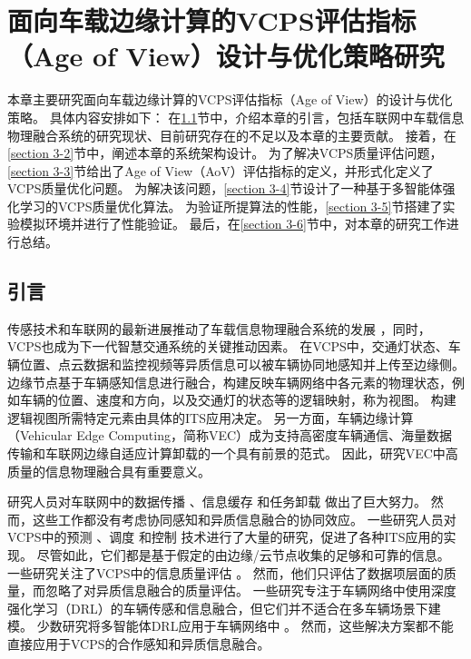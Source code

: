 \chapter{面向车载边缘计算的VCPS评估指标（Age of View）设计与优化策略研究}
本章主要研究面向车载边缘计算的VCPS评估指标（Age of View）的设计与优化策略。
具体内容安排如下：
在\ref{section 3-1}节中，介绍本章的引言，包括车联网中车载信息物理融合系统的研究现状、目前研究存在的不足以及本章的主要贡献。
接着，在\ref{section 3-2}节中，阐述本章的系统架构设计。
为了解决VCPS质量评估问题，\ref{section 3-3}节给出了Age of View（AoV）评估指标的定义，并形式化定义了VCPS质量优化问题。
为解决该问题，\ref{section 3-4}节设计了一种基于多智能体强化学习的VCPS质量优化算法。
为验证所提算法的性能，\ref{section 3-5}节搭建了实验模拟环境并进行了性能验证。
最后，在\ref{section 3-6}节中，对本章的研究工作进行总结。

\section{引言}\label{section 3-1}

传感技术和车联网的最新进展推动了车载信息物理融合系统的发展 \cite{jia2015survey}，同时，VCPS也成为下一代智慧交通系统的关键推动因素。
在VCPS中，交通灯状态、车辆位置、点云数据和监控视频等异质信息可以被车辆协同地感知并上传至边缘侧。
边缘节点基于车辆感知信息进行融合，构建反映车辆网络中各元素的物理状态，例如车辆的位置、速度和方向，以及交通灯的状态等的逻辑映射，称为视图。
构建逻辑视图所需特定元素由具体的ITS应用决定。
另一方面，车辆边缘计算（Vehicular Edge Computing，简称VEC）\cite{liu2022fedcpf}成为支持高密度车辆通信、海量数据传输和车联网边缘自适应计算卸载的一个具有前景的范式。
因此，研究VEC中高质量的信息物理融合具有重要意义。

研究人员对车联网中的数据传播 \cite{liu2021fog, singh2020intent}、信息缓存 \cite{zhang2022digital, dai2020deep, su2018an} 和任务卸载 \cite{shang2021deep, liao2021learning} 做出了巨大努力。
然而，这些工作都没有考虑协同感知和异质信息融合的协同效应。
一些研究人员对VCPS中的预测 \cite{zhang2019a, zhang2020data}、调度 \cite{li2020cyber, lian2021cyber} 和控制 \cite{dai2016a, hu2017cyber, lv2018driving} 技术进行了大量的研究，促进了各种ITS应用的实现。
尽管如此，它们都是基于假定的由边缘/云节点收集的足够和可靠的信息。
一些研究关注了VCPS中的信息质量评估 \cite{liu2014temporal, dai2019temporal, liu2014scheduling, rager2017scalability, yoon2021performance}。
然而，他们只评估了数据项层面的质量，而忽略了对异质信息融合的质量评估。
一些研究专注于车辆网络中使用深度强化学习（DRL）的车辆传感和信息融合，但它们并不适合在多车辆场景下建模。
少数研究将多智能体DRL应用于车辆网络中 \cite{kumar2022multi, he2021efficient}。
然而，这些解决方案都不能直接应用于VCPS的合作感知和异质信息融合。

